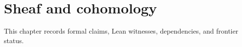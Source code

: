 \chapter{Sheaf and cohomology}\label{ch:sheaf}

This chapter records formal claims, Lean witnesses, dependencies, and frontier status.








